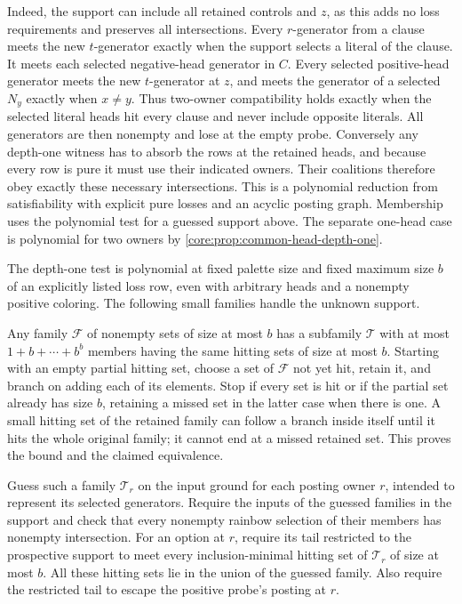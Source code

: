 Indeed, the support can include all retained
controls and $z$, as this adds no loss requirements
and preserves all intersections. Every $r$-generator
from a clause meets the new $t$-generator exactly
when the support selects a literal of the clause.
It meets each selected negative-head generator in
$C$. Every selected positive-head generator meets
the new $t$-generator at $z$, and meets the generator
of a selected $N_y$ exactly when $x\ne y$.
Thus two-owner compatibility holds exactly when
the selected literal heads hit every clause and
never include opposite literals. All generators
are then nonempty and lose at the empty probe.
Conversely any depth-one witness has to absorb
the rows at the retained heads, and because every
row is pure it must use their indicated owners.
Their coalitions therefore obey exactly these
necessary intersections. This is a polynomial
reduction from satisfiability with explicit pure
losses and an acyclic posting graph. Membership
uses the polynomial test for a guessed support
above. The separate one-head case is polynomial
for two owners by \cref{core:prop:common-head-depth-one}.

The depth-one test is polynomial at fixed palette
size and fixed maximum size $b$ of an explicitly
listed loss row, even with arbitrary heads and a
nonempty positive coloring. The following small
families handle the unknown support.

Any family $\mathcal F$ of nonempty sets of size
at most $b$ has a subfamily $\mathcal T$ with at
most $1+b+\cdots+b^b$ members having the same
hitting sets of size at most $b$. Starting with
an empty partial hitting set, choose a set of
$\mathcal F$ not yet hit, retain it, and branch
on adding each of its elements. Stop if every
set is hit or if the partial set already has
size $b$, retaining a missed set in the latter
case when there is one. A small hitting set of
the retained family can follow a branch inside
itself until it hits the whole original family;
it cannot end at a missed retained set. This
proves the bound and the claimed equivalence.

Guess such a family $\mathcal T_r$ on the input
ground for each posting owner $r$, intended to
represent its selected generators. Require the
inputs of the guessed families in the support
and check that every nonempty rainbow selection
of their members has nonempty intersection.
For an option at $r$, require its tail restricted
to the prospective support to meet every
inclusion-minimal hitting set of $\mathcal T_r$
of size at most $b$. All these hitting sets lie
in the union of the guessed family. Also require
the restricted tail to escape the positive
probe's posting at $r$.

